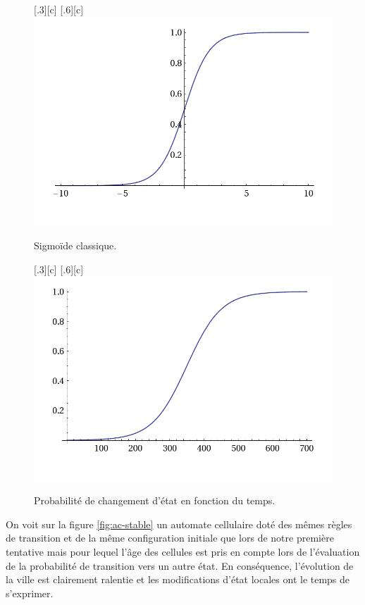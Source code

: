 \documentclass[12pt]{article}
\begin{document}
\begin{figure}[H]
  \centering
  \subcaptionbox{}[.3\linewidth][c]{
  }
  \subcaptionbox{}[.6\linewidth][c]{
    \includegraphics[width=.6\linewidth]{images/sigmoid.png}
  }
  \caption{Sigmoïde classique.}
  \label{fig:sigmoide1}
\end{figure}

\begin{figure}[H]
  \centering
  \subcaptionbox{}[.3\linewidth][c]{
  }
  \subcaptionbox{}[.6\linewidth][c]{
    \includegraphics[width=.6\linewidth]{images/sigmoid-age.png}
  }
  \caption{Probabilité de changement d'état en fonction du temps.}
  \label{fig:sigmoide2}
\end{figure}

On voit sur la figure \ref{fig:ac-stable} un automate cellulaire doté
des mêmes règles de transition et de la même configuration initiale
que lors de notre première tentative mais pour lequel l'âge des
cellules est pris en compte lors de l'évaluation de la probabilité de
transition vers un autre état. En conséquence, l'évolution de la ville
est clairement ralentie et les modifications d'état locales ont le
temps de s'exprimer.
\end{document}
